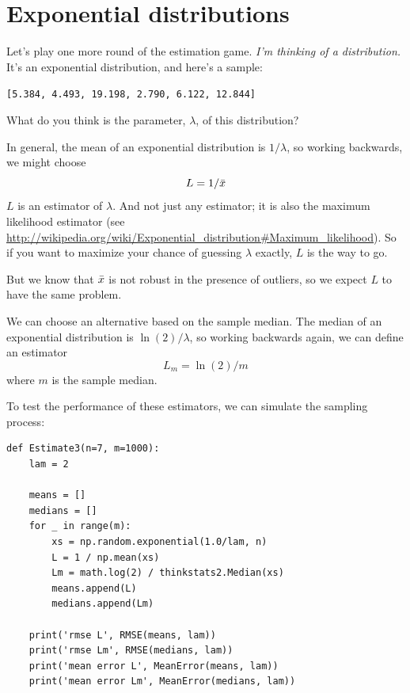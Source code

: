 \documentclass[12pt]{book}
\begin{document}
\section{Exponential distributions}

Let's play one more round of the estimation game.
{\em I'm thinking of a distribution.\/}  It's an exponential distribution, and 
here's a sample:

{\tt [5.384, 4.493, 19.198, 2.790, 6.122, 12.844]}

What do you think is the parameter, $\lambda$, of this distribution?

\newcommand{\lamhat}{L}
\newcommand{\lamhatmed}{L_m}

In general, the mean of an exponential distribution is $1/\lambda$,
so working backwards, we might choose
%
\[ \lamhat = 1 / \xbar\]
%
$\lamhat$ is an
estimator of $\lambda$.  And not just any estimator; it is also the
maximum likelihood estimator (see
\url{http://wikipedia.org/wiki/Exponential_distribution#Maximum_likelihood}).
So if you want to maximize your chance of guessing $\lambda$ exactly,
$\lamhat$ is the way to go.

But we know that $\bar{x}$ is not robust in the presence of outliers, so
we expect $\lamhat$ to have the same problem.

We can choose an alternative based on the sample median.
The median of an exponential distribution is $\ln(2) / \lambda$,
so working backwards again, we can define an estimator
%
\[ \lamhatmed = \ln(2) / m \]
%
where $m$ is the sample median.

To test the performance of these estimators, we can simulate the
sampling process:

\begin{verbatim}
def Estimate3(n=7, m=1000):
    lam = 2

    means = []
    medians = []
    for _ in range(m):
        xs = np.random.exponential(1.0/lam, n)
        L = 1 / np.mean(xs)
        Lm = math.log(2) / thinkstats2.Median(xs)
        means.append(L)
        medians.append(Lm)

    print('rmse L', RMSE(means, lam))
    print('rmse Lm', RMSE(medians, lam))
    print('mean error L', MeanError(means, lam))
    print('mean error Lm', MeanError(medians, lam))
\end{verbatim}
\end{document}
